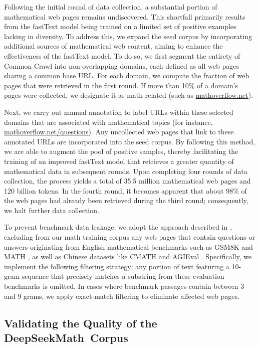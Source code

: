 \begin{itemize}[topsep=0pt]
Following the initial round of data collection, a substantial portion of mathematical web pages remains undiscovered. This shortfall primarily results from the fastText model being trained on a limited set of positive examples lacking in diversity. To address this, we expand the seed corpus by incorporating additional sources of mathematical web content, aiming to enhance the effectiveness of the fastText model. To do so, we first segment the entirety of Common Crawl into non-overlapping domains, each defined as all web pages sharing a common base URL. For each domain, we compute the fraction of web pages that were retrieved in the first round. If more than 10\% of a domain’s pages were collected, we designate it as math-related (such as \url{mathoverflow.net}). 

Next, we carry out manual annotation to label URLs within these selected domains that are associated with mathematical topics (for instance, \url{mathoverflow.net/questions}). Any uncollected web pages that link to these annotated URLs are incorporated into the seed corpus. By following this method, we are able to augment the pool of positive samples, thereby facilitating the training of an improved fastText model that retrieves a greater quantity of mathematical data in subsequent rounds. Upon completing four rounds of data collection, the process yields a total of 35.5 million mathematical web pages and 120 billion tokens. In the fourth round, it becomes apparent that about 98\% of the web pages had already been retrieved during the third round; consequently, we halt further data collection.

To prevent benchmark data leakage, we adopt the approach described in \cite{deepseek-coder}, excluding from our math training corpus any web pages that contain questions or answers originating from English mathematical benchmarks such as GSM8K \citep{gsm8k} and MATH \citep{MATH}, as well as Chinese datasets like CMATH \citep{wei2023cmath} and AGIEval \citep{agieval}. Specifically, we implement the following filtering strategy: any portion of text featuring a 10-gram sequence that precisely matches a substring from these evaluation benchmarks is omitted. In cases where benchmark passages contain between 3 and 9 grams, we apply exact-match filtering to eliminate affected web pages.

\subsection{Validating the Quality of the DeepSeekMath~Corpus}


\end{itemize}
